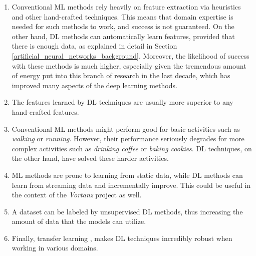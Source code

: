 \documentclass[extern,palatino]{cgMA}
\begin{document}
\begin{enumerate}
    \item Conventional ML methods rely heavily on feature extraction via heuristics and other hand-crafted techniques. This means that domain expertise is needed for such methods to work, and success is not guaranteed. On the other hand, DL methods can automatically learn features, provided that there is enough data, as explained in detail in Section \ref{artificial_neural_networks_background}. Moreover, the likelihood of success with these methods is much higher, especially given the tremendous amount of energy put into this branch of research in the last decade, which has improved many aspects of the deep learning methods.
    \item The features learned by DL techniques are usually more superior to any hand-crafted features.
    \item Conventional ML methods might perform good for basic activities such as \textit{walking} or \textit{running}. However, their performance seriously degrades for more complex activities such as \textit{drinking coffee} or \textit{baking cookies}. DL techniques, on the other hand, have solved these harder activities.
    \item ML methods are prone to learning from static data, while DL methods can learn from streaming data and incrementally improve. This could be useful in the context of the \textit{Vortanz} project as well.
    \item A dataset can be labeled by unsupervised DL methods, thus increasing the amount of data that the models can utilize.
    \item Finally, transfer learning \cite{shaha2018transfer}, makes DL techniques incredibly robust when working in various domains.
\end{enumerate}
\end{document}
